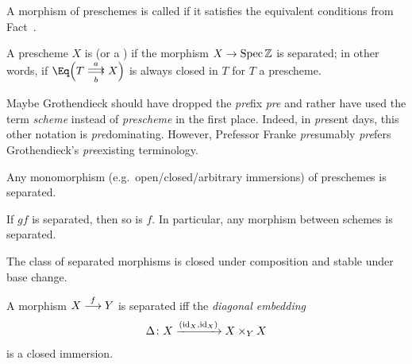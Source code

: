 \documentclass[a4paper,parskip=half,numbers=enddot, DIV=12]{scrreprt}
\begin{document}
\begin{defi}
	\begin{alphanumerate}
		\item {} A morphism of preschemes is called  if it satisfies the equivalent conditions from Fact~.
		\item A prescheme $X$ is  (or a ) if the morphism $X\morphism\Spec \IZ$ is separated; in other words, if $\Eq\Big(T\doublemorphism[a][b]X\Big)$ is always closed in $T$ for $T$ a prescheme.
	\end{alphanumerate}
\end{defi}
\begin{rem*}
	Maybe Grothendieck should have dropped the \emph{pre}fix \emph{pre} and rather have used the term \emph{scheme} instead of \emph{prescheme} in the first place. Indeed, in \emph{pre}sent days, this other notation is \emph{pre}dominating. However, Prefessor Franke \emph{pre}sumably \emph{pre}fers Grothendieck's \emph{pre}existing terminology.
\end{rem*}
\begin{fact}
	\begin{alphanumerate}
		\item {} Any monomorphism (e.g.\ open/closed/arbitrary immersions) of preschemes is separated.
		\item If $gf$ is separated, then so is $f$. In particular, any morphism between schemes is separated.
		\item The class of separated morphisms is closed under composition and stable under base change.
		\item A morphism $X\morphism[f]Y$ is separated iff the \emph{diagonal embedding} 
		\begin{align*}
			\Delta\colon X\xrightarrow{(\operatorname{id}_X,\operatorname{id}_X)}X\times_YX
		\end{align*}
		is a closed immersion.
	\end{alphanumerate}
\end{fact}
\end{document}
